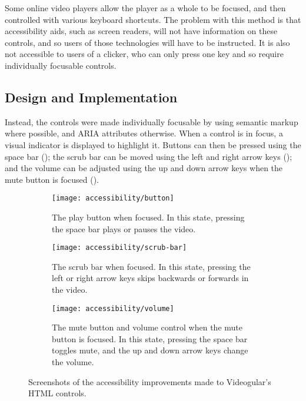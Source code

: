 Some online video players allow the player as a whole to be focused, and then controlled with various keyboard shortcuts. The problem with this method is that accessibility aids, such as screen readers, will not have information on these controls, and so users of those technologies will have to be instructed. It is also not accessible to users of a clicker, who can only press one key and so require individually focusable controls.

\subsection{Design and Implementation} 
Instead, the controls were made individually focusable by using semantic markup where possible, and \gls{ARIA} attributes otherwise. When a control is in focus, a visual indicator is displayed to highlight it. Buttons can then be pressed using the space bar (); the scrub bar can be moved using the left and right arrow keys (); and the volume can be adjusted using the up and down arrow keys when the mute button is focused ().

\begin{figure}
	\begin{subfigure}[]{\textwidth}
		\texttt{[image: accessibility/button]}
		\caption{The play button when focused. In this state, pressing the space bar plays or pauses the video.}
		\label{Figure:Accessibility/Screenshots/Button}
	\end{subfigure}
	\begin{subfigure}[]{\textwidth}
		\texttt{[image: accessibility/scrub-bar]}
		\caption{The scrub bar when focused. In this state, pressing the left or right arrow keys skips backwards or forwards in the video.}
		\label{Figure:Accessibility/Screenshots/ScrubBar}
	\end{subfigure}
	\begin{subfigure}[]{\textwidth}
		\texttt{[image: accessibility/volume]}
		\caption{The mute button and volume control when the mute button is focused. In this state, pressing the space bar toggles mute, and the up and down arrow keys change the volume.}
		\label{Figure:Accessibility/Screenshots/Volume}
	\end{subfigure}
	\caption{Screenshots of the accessibility improvements made to Videogular's HTML controls.}
	\label{Figure:Accessibility/Screenshots}
\end{figure}

